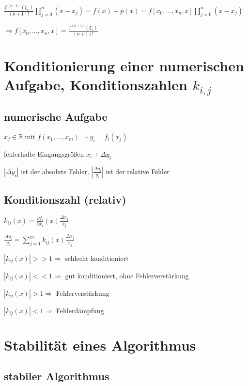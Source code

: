 \documentclass[12pt,a4paper]{article} %
\begin{document}
	$\frac{f^{(n + 1)}(\xi_x)}{(n + 1)!} \prod\limits_{j = 0}^{n} (x-x_j) = f(x) - p(x) = f[x_0, ..., x_n, x] \prod\limits_{j = 0}^{n}(x - x_j)$
	
	$\Rightarrow f[x_0, ..., x_n, x] = \frac{f^{(n + 1)}(\xi_x)}{(n + 1)!}$
	
	\newpage
	
	\section{Konditionierung einer numerischen Aufgabe, Konditionszahlen \texorpdfstring{$k_{i, j}$}{k i, j}}
	
	\subsection{numerische Aufgabe}
	
	$x_j \in \mathbb{R} \text{ mit }f(x_1, ..., x_m) \Rightarrow y_i = f_i(x_j)$
	
	fehlerhafte Eingangsgrößen $x_i + \Delta y_i$
	
	$|\Delta y_i|$ ist der absolute Fehler, $|\frac{\Delta y_i}{y_i}|$ ist der relative Fehler
	
	\subsection{Konditionszahl (relativ)}
	
	$k_{ij}(x) = \frac{\partial f_i}{\partial x_i}(x) \frac{\Delta x_j}{x_j}$
	
	$\frac{\Delta y_i}{y_i} = \sum\limits_{j = 1}^{m}k_{ij}(x)\frac{\Delta x_j}{x_j}$
	
	$|k_{ij}(x)| >> 1 \Rightarrow$ schlecht konditioniert
	
	$|k_{ij}(x)| << 1 \Rightarrow$ gut konditioniert, ohne Fehlerverstärkung
	
	$|k_{ij}(x)| > 1 \Rightarrow$ Fehlerverstärkung
	
	$|k_{ij}(x)| < 1 \Rightarrow$ Fehlerdämpfung
	
	\newpage
	
	\section{Stabilität eines Algorithmus}
	
	\subsection{stabiler Algorithmus}
	
\end{document}
